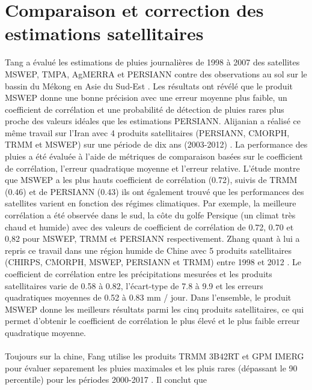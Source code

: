 \section{Comparaison et correction des estimations satellitaires}
Tang a évalu\'e les estimations de pluies  journalières de 1998 à 2007 des satellites MSWEP, TMPA, AgMERRA et PERSIANN  contre des observations au sol  sur le bassin du Mékong en  Asie du Sud-Est \cite{tang_assessing_2019}. Les résultats ont révélé que le produit MSWEP donne une bonne précision avec une erreur moyenne plus faible,  un coefficient de corrélation et une probabilité de détection de pluies rares  plus proche des valeurs idéales que les estimations PERSIANN.
 Alijanian a r\'ealis\'e ce m\^eme travail sur l'Iran avec 4 produits satellitaires (PERSIANN, CMORPH, TRMM et MSWEP) sur une période de dix ans (2003-2012) \cite{alijanian_evaluation_2017}. La performance des pluies a été évaluée à l'aide de métriques de comparaison basées sur le coefficient de corrélation,  l'erreur quadratique moyenne et l'erreur relative. L'étude montre que MSWEP a les plus hauts coefficient de corrélation  (0.72), suivis de TRMM (0.46) et de PERSIANN  (0.43) ils ont également trouv\'e que les performances des satellites  varient en fonction des régimes climatiques. Par exemple, la meilleure corrélation a été observée dans le sud, la côte du golfe Persique (un climat très chaud et humide) avec des valeurs de coefficient de corrélation de 0.72, 0.70 et 0,82 pour MSWEP, TRMM et PERSIANN respectivement. 
 Zhang quant \`a lui a repris ce travail dans une région humide de Chine  avec 5 produits satellitaires (CHIRPS, CMORPH, MSWEP, PERSIANN et TRMM) entre 1998 et 2012 \cite{zhang_suitability_2019}.
   Le coefficient de corrélation entre les précipitations mesurées et les produits satellitaires varie de 0.58 à 0.82, l’écart-type de 7.8 à 9.9 et les erreurs quadratiques moyennes de 0.52 à 0.83 mm / jour. Dans l’ensemble, le produit MSWEP donne les meilleurs résultats parmi les cinq produits satellitaires, ce qui permet d’obtenir le coefficient de corrélation le plus élevé et le plus faible erreur quadratique moyenne.  
  \\ \ \\
  Toujours sur la chine, Fang utilise les produits TRMM 3B42RT et GPM IMERG pour  \'evaluer separement les pluies maximales et les pluis rares (dépassant le 90 percentile) pour les périodes 2000-2017  \cite{fang_evaluation_2019}. Il conclut que 
